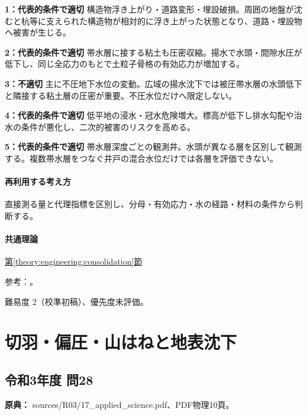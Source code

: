 \noindent\textbf{1：代表的条件で適切} 構造物浮き上がり・道路変形・埋設破損。周囲の地盤が沈むと杭等に支えられた構造物が相対的に浮き上がった状態となり、道路・埋設物へ被害が生じる。\par

\noindent\textbf{2：代表的条件で適切} 帯水層に接する粘土も圧密収縮。揚水で水頭・間隙水圧が低下し、同じ全応力のもとで土粒子骨格の有効応力が増加する。\par

\noindent\textbf{3：不適切} 主に不圧地下水位の変動。広域の揚水沈下では被圧帯水層の水頭低下と隣接する粘土層の圧密が重要。不圧水位だけへ限定しない。\par

\noindent\textbf{4：代表的条件で適切} 低平地の浸水・冠水危険増大。標高が低下し排水勾配や治水の条件が悪化し、二次的被害のリスクを高める。\par

\noindent\textbf{5：代表的条件で適切} 帯水層深度ごとの観測井。水頭が異なる層を区別して観測する。複数帯水層をつなぐ井戸の混合水位だけでは各層を評価できない。\par

\paragraph{再利用する考え方} 直接測る量と代理指標を区別し、分母・有効応力・水の経路・材料の条件から判断する。

\paragraph{共通理論} \hyperref[theory:engineering:consolidation]{第\ref*{theory:engineering:consolidation}節}

\par 参考：\cite{eng52_subsidence_ref,eng52_consolidation}。

\par 難易度 2（校準初稿）、優先度未評価。

\section{切羽・偏圧・山はねと地表沈下}

\subsection{令和3年度 問28}
\label{q:r03-reg-applied-28}

\noindent\textbf{原典：} sources/R03/17\_applied\_science.pdf、PDF物理10頁。

